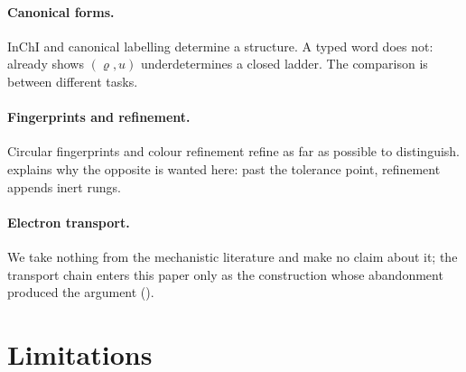 \documentclass[11pt,a4paper]{article}
\theoremstyle{clthm}
\theoremstyle{definition}
\theoremstyle{remark}
\newcommand{\circu}{\varrho}
\newcommand{\unif}{u}
\begin{document}
\paragraph{Canonical forms.} InChI \citep{heller2015} and canonical
labelling \citep{morgan1965} determine a structure. A typed word does not:
 already shows $(\circu,\unif)$ underdetermines a closed
ladder. The comparison is between different tasks.

\paragraph{Fingerprints and refinement.} Circular fingerprints
\citep{rogers2010} and colour refinement \citep{weisfeiler1968,arvind2015}
refine as far as possible to distinguish.  explains
why the opposite is wanted here: past the tolerance point, refinement
appends inert rungs.

\paragraph{Electron transport.} We take nothing from the mechanistic
literature \citep{mitchell1961,moser1992,marcus1985} and make no claim
about it; the transport chain enters this paper only as the construction
whose abandonment produced the argument ().

\section{Limitations}
\label{sec:limits}
\end{document}
